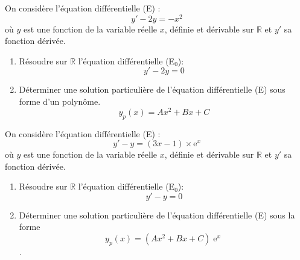 \documentclass[11pt,a4paper]{article}
\newcommand{\cadreblanc}[1]{%
	\medskip\framebox[\linewidth][c]{%
		\rule{0mm}{#1mm}}\par
	\medskip}
\DeclareMathOperator{\e}{e}
\begin{document}
	\newpage
	
	
	
	  On considère l'équation différentielle (E) :\[
	y' - 2y = -x^{2}\]
	où $y$ est une fonction de la variable réelle $x$, définie
	et dérivable sur $\mathbb{R}$ et $y'$ sa fonction dérivée.
	\\
	\begin{enumerate}
		\item Résoudre sur $\mathbb{R}$ l'équation différentielle (E$_{0}$):
		\[ y' - 2y = 0\]
		\vspace{-5mm}
		\cadreblanc{25}
		
		\item Déterminer une solution particulière de l’équation différentielle (E) sous forme d’un polynôme. $$y_p(x)=Ax^2+Bx+C$$
		
		\cadreblanc{80}
		
	\end{enumerate} 
	
	\newpage
	
	 On considère l'équation différentielle (E) :\[
	y' -  y = (3x-1) \times \text{e}^{x}\]
	où $y$ est une fonction de la variable réelle $x$, définie
	et dérivable sur $\mathbb{R}$ et $y'$ sa fonction dérivée.
	\\
	\begin{enumerate}
		\item Résoudre sur $\mathbb{R}$ l'équation différentielle (E$_{0}$):
		\[ y' - y = 0\]
		\vspace{-5mm}
		\cadreblanc{25}
		
		\item Déterminer une solution particulière de l’équation différentielle (E) sous la forme $$y_p(x)= (Ax^2+Bx+C) \e^x$$.
		
		\cadreblanc{80}
		
	\end{enumerate} 
	
	
	
\end{document}
